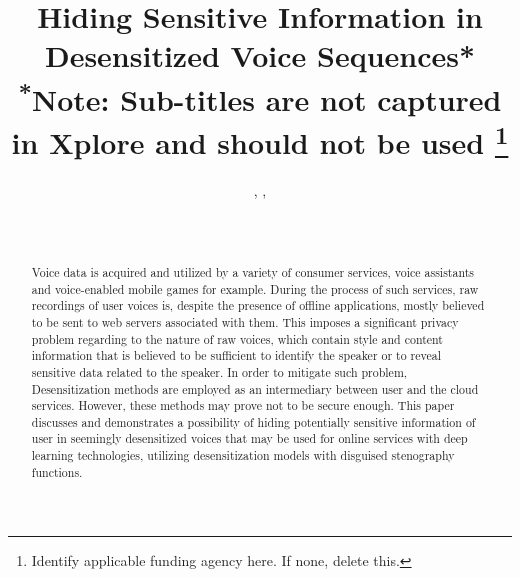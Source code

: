\documentclass[journal]{IEEEtran} %
\begin{document}
\title{Hiding Sensitive Information in Desensitized Voice Sequences*\\
{\footnotesize \textsuperscript{*}Note: Sub-titles are not captured in Xplore and should not be used}
\thanks{Identify applicable funding agency here. If none, delete this.}
}

\author{%
    , %
    , %
    \\%
    \\%
    \\%
}

\maketitle

\begin{abstract}
Voice data is acquired and utilized by a variety of consumer services, voice assistants and voice-enabled mobile games for example. During the process of such services, raw recordings of user voices is, despite the presence of offline applications, mostly believed to be sent to web servers associated with them. This imposes a significant privacy problem regarding to the nature of raw voices, which contain style and content information that is believed to be sufficient to identify the speaker or to reveal sensitive data related to the speaker. In order to mitigate such problem, Desensitization methods are employed as an intermediary between user and the cloud services. However, these methods may prove not to be secure enough. This paper discusses and demonstrates a possibility of hiding potentially sensitive information of user in seemingly desensitized voices that may be used for online services with deep learning technologies, utilizing desensitization models with disguised stenography functions.
\end{abstract}
\end{document}

